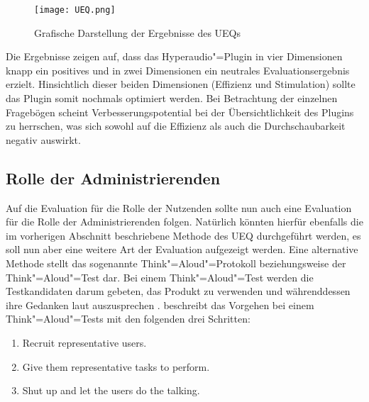 \begin{figure}[h!]
\texttt{[image: UEQ.png]}
\caption{\label{fig:UEQ}Grafische Darstellung der Ergebnisse des UEQs}
\end{figure}

Die Ergebnisse zeigen auf, dass das Hyperaudio"=Plugin in vier Dimensionen knapp ein positives und in zwei Dimensionen ein neutrales Evaluationsergebnis erzielt. Hinsichtlich dieser beiden Dimensionen (Effizienz und Stimulation) sollte das Plugin somit nochmals optimiert werden. Bei Betrachtung der einzelnen Fragebögen scheint Verbesserungspotential bei der Übersichtlichkeit des Plugins zu herrschen, was sich sowohl auf die Effizienz als auch die Durchschaubarkeit negativ auswirkt.


\subsection{Rolle der Administrierenden}
Auf die Evaluation für die Rolle der Nutzenden sollte nun auch eine Evaluation für die Rolle der Administrierenden folgen. Natürlich könnten hierfür ebenfalls die im vorherigen Abschnitt beschriebene Methode des UEQ durchgeführt werden, es soll nun aber eine weitere Art der Evaluation aufgezeigt werden. Eine alternative Methode stellt das sogenannte Think"=Aloud"=Protokoll beziehungsweise der Think"=Aloud"=Test dar. Bei einem Think"=Aloud"=Test werden die Testkandidaten darum gebeten, das Produkt zu verwenden und währenddessen ihre Gedanken laut auszusprechen \citep{nielsen2012thinking}. \cite{nielsen2012thinking} beschreibt das Vorgehen bei einem Think"=Aloud"=Tests mit den folgenden drei Schritten:

\begin{enumerate}
\item Recruit representative users.
\item Give them representative tasks to perform.
\item Shut up and let the users do the talking.
\end{enumerate}



